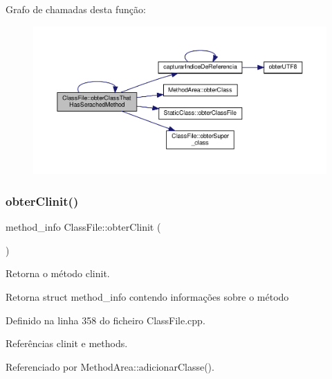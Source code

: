Grafo de chamadas desta função\+:\nopagebreak
\begin{figure}[H]
\begin{center}
\leavevmode
\includegraphics[width=350pt]{classClassFile_a4d0ac62c4d6218ddada33f715ebaf633_cgraph}
\end{center}
\end{figure}
\mbox{\label{classClassFile_a1141f5a8c856d5f3931f0b518e219f79}} 
\subsubsection{\texorpdfstring{obter\+Clinit()}{obterClinit()}}
{\footnotesize\ttfamily method\+\_\+info Class\+File\+::obter\+Clinit (\begin{DoxyParamCaption}{ }\end{DoxyParamCaption})}



Retorna o método clinit. 

\begin{DoxyReturn}{Retorna}
struct method\+\_\+info contendo informações sobre o método 
\end{DoxyReturn}


Definido na linha 358 do ficheiro Class\+File.\+cpp.



Referências clinit e methods.



Referenciado por Method\+Area\+::adicionar\+Classe().

\mbox{\label{classClassFile_ab70fe581c4b7a1824adf490c3a53bcc7}} 
